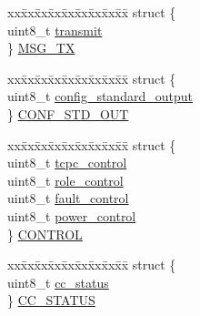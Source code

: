 \begin{DoxyCompactItemize}
\begin{tabbing}
\end{tabbing}\item 
\begin{tabbing}
xx\=xx\=xx\=xx\=xx\=xx\=xx\=xx\=xx\=\kill
struct \{\\
\>uint8\_t \hyperlink{structpd__phy__TCPC__reg__cache__t_ac97cde79dc5aa0b85caf836b4e3c8870}{transmit}\\
\} \hyperlink{structpd__phy__TCPC__reg__cache__t_ab34efc76102ec53e13822f28153de3da}{MSG\_TX}\\

\end{tabbing}\item 
\begin{tabbing}
xx\=xx\=xx\=xx\=xx\=xx\=xx\=xx\=xx\=\kill
struct \{\\
\>uint8\_t \hyperlink{structpd__phy__TCPC__reg__cache__t_a9b844669333a0f7bbf0c2cd9533a2596}{config\_standard\_output}\\
\} \hyperlink{structpd__phy__TCPC__reg__cache__t_a6cec48fdaba1119fb070c82003136b05}{CONF\_STD\_OUT}\\

\end{tabbing}\item 
\begin{tabbing}
xx\=xx\=xx\=xx\=xx\=xx\=xx\=xx\=xx\=\kill
struct \{\\
\>uint8\_t \hyperlink{structpd__phy__TCPC__reg__cache__t_a8271f0587de98c5504df7e2bc489835d}{tcpc\_control}\\
\>uint8\_t \hyperlink{structpd__phy__TCPC__reg__cache__t_a7b30d9898d43fbb5ffa0000d85164e24}{role\_control}\\
\>uint8\_t \hyperlink{structpd__phy__TCPC__reg__cache__t_af1999bdfc4f6ada6288bc8eb56ca3289}{fault\_control}\\
\>uint8\_t \hyperlink{structpd__phy__TCPC__reg__cache__t_a6f2b98b2132297cd69612b45fcac2c75}{power\_control}\\
\} \hyperlink{structpd__phy__TCPC__reg__cache__t_a62952ade18c2ee72f74d53efa4f99378}{CONTROL}\\

\end{tabbing}\item 
\begin{tabbing}
xx\=xx\=xx\=xx\=xx\=xx\=xx\=xx\=xx\=\kill
struct \{\\
\>uint8\_t \hyperlink{structpd__phy__TCPC__reg__cache__t_a81878558e3ea58ad7ec3ac7e2a6221ed}{cc\_status}\\
\} \hyperlink{structpd__phy__TCPC__reg__cache__t_a52ffc1628e54c6bb8073989ed96d2c3e}{CC\_STATUS}\\


\end{tabbing}
\end{DoxyCompactItemize}
